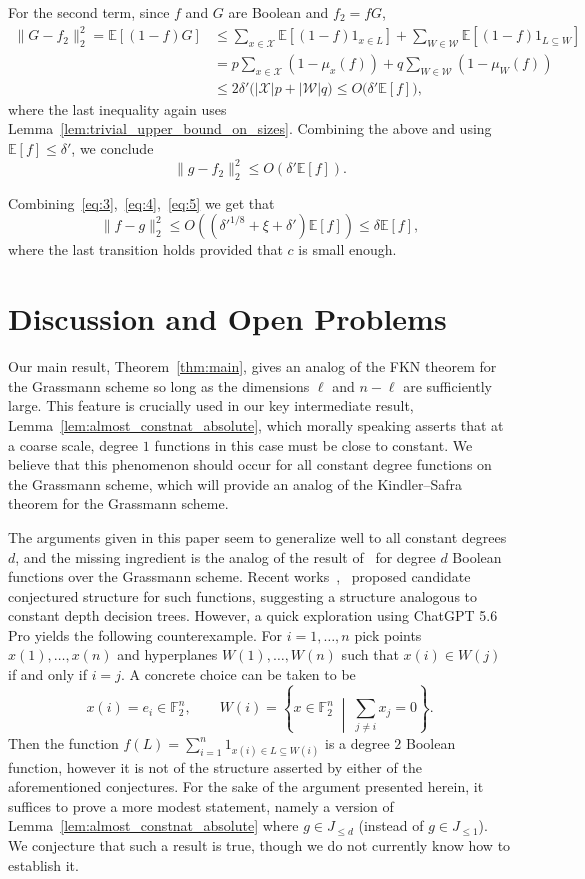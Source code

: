 \documentclass[11pt]{article}
\newcommand\E{\mathbb{E}}
\newcommand\norm[1]{\| #1 \|}
\renewcommand\leq{\leqslant}
\begin{document}
For the second term, since $f$ and $G$ are Boolean and $f_2=fG$,
\begin{align*}
  \norm{G-f_2}_2^2 =\E[(1-f)G] &\le \sum_{x\in\mathcal{X}}\E[(1-f)1_{x\in L}]
    +\sum_{W\in\mathcal{W}}\E[(1-f)1_{L\subseteq W}]\\
  &=p\sum_{x\in\mathcal{X}}(1-\mu_x(f))
    +q\sum_{W\in\mathcal{W}}(1-\mu_W(f))\\
  &\le 2\delta'\bigl(|\mathcal{X}|p+|\mathcal{W}|q\bigr)\leq O\bigl(\delta'\E[f]\bigr),
\end{align*}
where the last inequality again uses Lemma~\ref{lem:trivial_upper_bound_on_sizes}. Combining the above and using $\E[f]\leq \delta'$, we conclude
\begin{equation}\label{eq:5}
  \norm{g-f_2}_2^2 
  \leq O(\delta' \E[f]).
\end{equation}
  
Combining~\eqref{eq:3},~\eqref{eq:4},~\eqref{eq:5} we get that
\[
\norm{f-g}_2^2\leq 
O((\delta'^{1/8}+\xi+\delta')\E[f])\leq \delta\E[f],
\]
where the last transition holds provided that $c$ is small enough.
\section{Discussion and Open Problems}
Our main result, Theorem~\ref{thm:main}, gives an analog of the FKN theorem for the Grassmann scheme so long as the dimensions $\ell$ and $n-\ell$ are sufficiently large. This feature is crucially used in our key intermediate result, Lemma~\ref{lem:almost_constnat_absolute}, which morally speaking asserts that at a coarse scale, degree $1$ functions in this case must be close to constant. We believe that this phenomenon should occur for all constant degree functions on the Grassmann scheme, which will provide an analog of the Kindler--Safra theorem for the Grassmann scheme. 

The arguments given in this paper seem to generalize well to all constant degrees $d$, and the missing ingredient is the analog of the result of~\cite{FilmusIhringer} for degree $d$ Boolean functions over the Grassmann scheme. Recent works~\cite[Conjecture 7.2]{deg2Gras},~\cite{filmus2019boolean} proposed candidate conjectured structure for such functions, suggesting a structure analogous to constant depth decision trees. However, a quick exploration using ChatGPT 5.6 Pro yields the following counterexample. For $i=1,\ldots,n$ pick points $x(1),\ldots,x(n)$ and hyperplanes $W(1),\ldots,W(n)$ such that $x(i)\in W(j)$ if and only if $i=j$. A concrete choice can be taken to be
\[
x(i) = e_i\in\mathbb{F}_2^n,
\qquad
W(i) = \left\{x\in \mathbb{F}_2^n \;\middle|\; \sum\limits_{j\neq i}x_j=0\right\}.
\]
Then the function 
$f(L) = \sum\limits_{i=1}^{n} 1_{x(i)\in L\subseteq W(i)}$ is a degree $2$ Boolean function, however it is not of the structure asserted by either of the aforementioned conjectures. For the sake of the argument presented herein, it suffices to prove a more modest statement, namely a version of Lemma~\ref{lem:almost_constnat_absolute} where $g\in J_{\leq d}$ (instead of $g\in J_{\leq 1}$). We conjecture that such a result is true, though we do not currently know how to establish it.


\appendix
\end{document}

